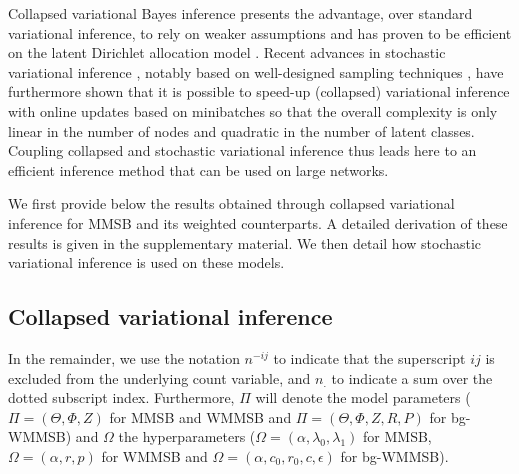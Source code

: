 Collapsed variational Bayes inference presents the advantage, over standard variational inference, to rely on weaker assumptions and has proven to be efficient on the latent Dirichlet allocation model \cite{teh2006collapsed}. Recent advances in stochastic variational inference \cite{hoffman2013stochastic}, notably based on well-designed sampling techniques \cite{gopalan2013efficient,kim2013efficient}, have furthermore shown that it is possible to speed-up (collapsed) variational inference with online updates based on minibatches so that the overall complexity is only linear in the number of nodes and quadratic in the number of latent classes. Coupling collapsed and stochastic variational inference thus leads here to an efficient inference method that can be used on large networks.

We first provide below the results obtained through collapsed variational inference for MMSB and its weighted counterparts. A detailed derivation of these results is given in the supplementary material. We then detail how stochastic variational inference is used on these models.

\subsection{Collapsed variational inference}

In the remainder, we use the notation $n^{-ij}$ to indicate that the superscript $ij$ is excluded from the underlying count variable, and $n_{\bm{.}}$ to indicate a sum over the dotted subscript index. Furthermore, $\Pi$ will denote the model parameters ($\Pi = (\Theta,\Phi,Z)$ for MMSB and WMMSB and $\Pi = (\Theta,\Phi,Z,R,P)$ for bg-WMMSB) and $\Omega$ the hyperparameters ($\Omega = (\alpha,\lambda_0,\lambda_1)$ for MMSB, $\Omega = (\alpha,r,p)$ for WMMSB and $\Omega = (\alpha, c_0, r_0, c, \epsilon)$ for bg-WMMSB). 

